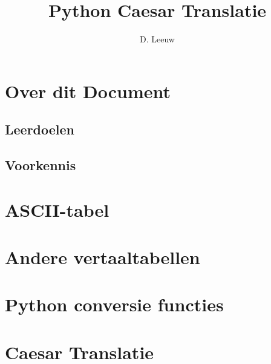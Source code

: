 \documentclass[a4paper,12pt,twoside,openright,titlepage]{article}
\author{D. Leeuw}
\title{Python Caesar Translatie}
\date{\today\\
\vfill
\raggedright
\copyright\ 2020-2025 Dennis Leeuw\\
}
\begin{document}

\maketitle


\section{Over dit Document}
\subsection{Leerdoelen}

\subsection{Voorkennis}
%



\section{ASCII-tabel}




\section{Andere vertaaltabellen}


\section{Python conversie functies}


\section{Caesar Translatie}


\printindex
\end{document}
